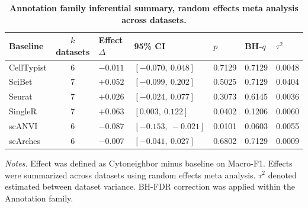 \documentclass[11pt]{article}
\begin{document}
\begin{table}[htbp]
\centering
\caption{\textbf{Annotation family inferential summary, random effects meta analysis across datasets.}}
\label{tab:s4_annotation_meta}
\scriptsize
\begin{tabularx}{\textwidth}{@{}L{0.15\textwidth} c L{0.12\textwidth} L{0.20\textwidth} L{0.10\textwidth} L{0.10\textwidth} Y@{}}
\toprule
\textbf{Baseline} & \textbf{\(k\) datasets} & \textbf{Effect \(\Delta\)} & \textbf{95\% CI} & \textbf{\(p\)} & \textbf{BH-\(q\)} & \textbf{\(\tau^2\)} \\
\midrule
CellTypist & 6 & \(-0.011\) & \([-0.070,\ 0.048]\) & 0.7129 & 0.7129 & 0.0048 \\
SciBet & 7 & \(+0.052\) & \([-0.099,\ 0.202]\) & 0.5025 & 0.7129 & 0.0404 \\
Seurat & 7 & \(+0.026\) & \([-0.024,\ 0.077]\) & 0.3073 & 0.6145 & 0.0036 \\
SingleR & 7 & \(+0.063\) & \([0.003,\ 0.122]\) & 0.0402 & 0.1206 & 0.0060 \\
scANVI & 6 & \(-0.087\) & \([-0.153,\ -0.021]\) & 0.0101 & 0.0603 & 0.0055 \\
scArches & 6 & \(-0.007\) & \([-0.041,\ 0.027]\) & 0.6802 & 0.7129 & 0.0009 \\
\bottomrule
\end{tabularx}

\vspace{0.5em}
{\raggedright\scriptsize\textit{Notes.} Effect was defined as Cytoneighbor minus baseline on Macro-F1. Effects were summarized across datasets using random effects meta analysis. \(\tau^2\) denoted estimated between dataset variance. BH-FDR correction was applied within the Annotation family.\par}
\end{table}

\FloatBarrier
\end{document}
